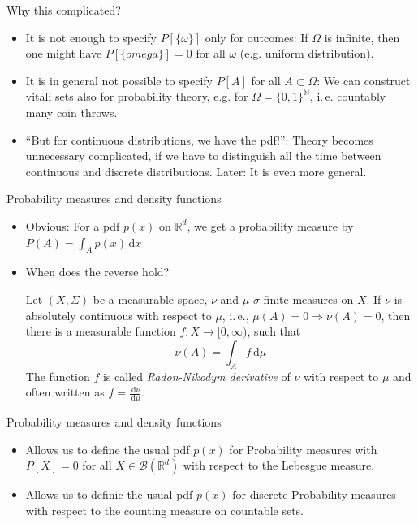 \documentclass[compress]{beamer}
\newcommand{\RR}{\mathbb{R}}
\newcommand{\NN}{\mathbb{N}}
\newcommand{\td}{\,\mathrm{d}}  %
\begin{document}
\begin{frame}
  Why this complicated?
  \begin{itemize}
  \item It is not enough to specify $P[\{\omega\}]$ only for outcomes: If
    $\Omega$ is infinite, then one might have $P[\{omega\}]=0$ for all $\omega$
    (e.g. uniform distribution).
  \item It is in general not possible to specify $P[A]$ for all $A \subset
    \Omega$: We can construct vitali sets also for probability theory, e.g. for
    $\Omega = \{0,1\}^\NN$, i.\,e. countably many coin throws.
  \item ``But for continuous distributions, we have the pdf!'': Theory becomes
    unnecessary complicated, if we have to distinguish all the time between
    continuous and discrete distributions. Later: It is even more general.
  \end{itemize}
\end{frame}

\begin{frame}{Probability measures and density functions}
  \begin{itemize}
  \item Obvious: For a pdf $p(x)$ on $\RR^d$, we get a probability measure by
    $P(A) = \int_A p(x)\td x$
  \item When does the reverse hold?
  \pause
  \begin{theorem}
    Let $(X, \Sigma)$ be a measurable space, $\nu$ and $\mu$ $\sigma$-finite
    measures on $X$. If $\nu$ is absolutely continuous with respect to $\mu$,
    i.\,e., $\mu(A) = 0 \Rightarrow \nu(A) = 0$, then there is a measurable
    function $f: X \to [0, \infty)$, such that
    \[
      \nu(A) = \int_A f \td \mu
    \]
    The function $f$ is called \textit{Radon-Nikodym derivative} of $\nu$ with
    respect to $\mu$ and often written as $f = \frac{\td \nu}{\td \mu}$.
  \end{theorem}
  \end{itemize}

\end{frame}

\begin{frame}{Probability measures and density functions}
  \begin{itemize}
  \item Allows us to define the usual pdf $p(x)$ for Probability measures with
    $P[X]=0$ for all $X \in \mathcal{B}(\RR^d)$ with respect to the Lebesgue
    measure.
  \item Allows us to definie the usual pdf $p(x)$ for discrete Probability
    measures with respect to the counting measure on countable sets.
  \end{itemize}
\end{frame}
\end{document}
